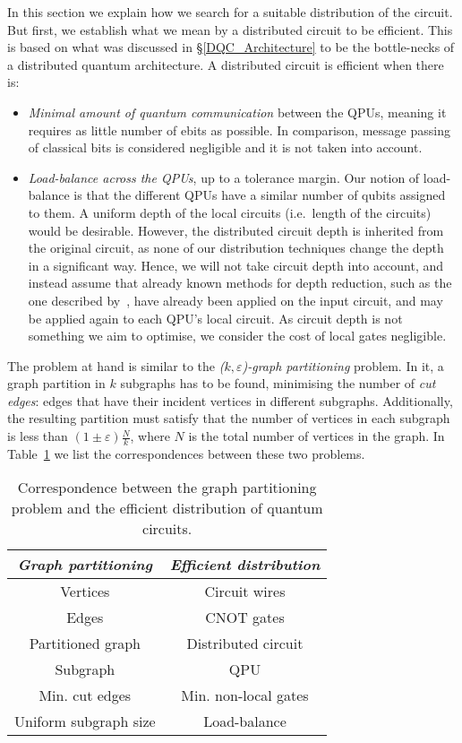 In this section we explain how we search for a suitable distribution of the circuit. But first, we establish what we mean by a distributed circuit to be efficient. This is based on what was discussed in \S\ref{DQC_Architecture} to be the bottle-necks of a distributed quantum architecture. A distributed circuit is efficient when there is:

\begin{itemize}
  \item \textit{Minimal amount of quantum communication} between the QPUs, meaning it requires as little number of ebits as possible. In comparison, message passing of classical bits is considered negligible and it is not taken into account.
  \item \textit{Load-balance across the QPUs}, up to a tolerance margin. Our notion of load-balance is that the different QPUs have a similar number of qubits assigned to them. A uniform depth of the local circuits (i.e.\ length of the circuits) would be desirable. However, the distributed circuit depth is inherited from the original circuit, as none of our distribution techniques change the depth in a significant way. Hence, we will not take circuit depth into account, and instead assume that already known methods for depth reduction, such as the one described by~\citet{DepthReduction}, have already been applied on the input circuit, and may be applied again to each QPU's local circuit. As circuit depth is not something we aim to optimise, we consider the cost of local gates negligible.
\end{itemize}

The problem at hand is similar to the  \textit{(\(k,\varepsilon\))-graph partitioning} problem. In it, a graph partition in \(k\) subgraphs has to be found, minimising the number of \textit{cut edges}: edges that have their incident vertices in different subgraphs. Additionally, the resulting partition must satisfy that the number of vertices in each subgraph is less than \((1 \pm \varepsilon)\frac{N}{k}\), where \(N\) is the total number of vertices in the graph. In Table~\ref{tab:matching} we list the correspondences between these two problems.

\begin{table}
\label{tab:matching}
\caption{Correspondence between the graph partitioning problem and the efficient distribution of quantum circuits.}
\centering
\begin{tabular}{|c|c|}
\hline
\textit{Graph partitioning} & \textit{Efficient distribution} \\
\hline
Vertices & Circuit wires \\
Edges & CNOT gates \\
Partitioned graph & Distributed circuit \\
Subgraph & QPU \\
Min. cut edges & Min. non-local gates \\
Uniform subgraph size & Load-balance \\
\hline
\end{tabular}
\end{table}

